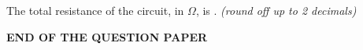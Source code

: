 \documentclass[journal]{IEEEtran}
\begin{document}
\begin{enumerate}[leftmargin=0pt]
\noindent The total resistance of the circuit, in $\Omega$, is \underline{\hspace{1.5cm}}. \textit{(round off up to 2 decimals)}

\hfill{}
\vspace{2em}
\begin{center}
\textbf{\textsc{END OF THE QUESTION PAPER}}
\end{center}
\end{enumerate}
\end{document}
